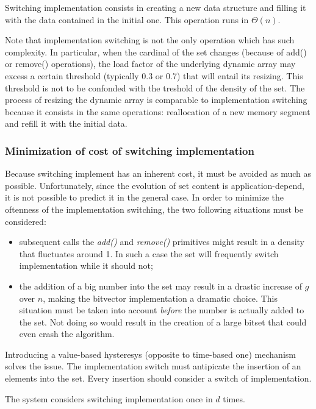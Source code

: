 \documentclass{article}
\newcommand{\complexityvalue}[1]{$\Theta(#1)$}
\newcommand{\prmtv}[1]{\textit{#1()}}
\begin{document}
Switching implementation consists in creating a new data structure and filling it with the data contained in the
initial one.
This operation runs in \complexityvalue{n}.

Note that implementation  switching is not the only operation which has such complexity. In particular, when the
cardinal of the set changes (because of add() or remove() operations), the load factor of the underlying dynamic array may
excess a certain threshold (typically 0.3 or 0.7) that will entail its resizing. This threshold is not to be
confonded with the treshold of the density of the set. The process of resizing the dynamic array
is comparable to implementation switching because it consists in the same operations: reallocation of a new memory segment and
refill it with the initial data.

\subsubsection{Minimization of cost of switching implementation}

Because switching implement has an inherent cost, it must be avoided as much as possible.
Unfortunately, since the evolution of set content is application-depend, it is not possible to predict it in the general case.
In order to minimize the oftenness of the implementation switching, the two following situations must be considered:
\begin{itemize}
  \item subsequent calls the \prmtv{add} and \prmtv{remove} primitives might result in a density that
fluctuates around 1. In such a case  the set will frequently switch implementation while it should not;
\item the addition of a big number into the set may result in a drastic increase of $g$ over $n$, making the
bitvector implementation a dramatic choice. This situation must be taken into account \textit{before}  the number is actually
added to the set. Not doing so would result in the creation of a large bitset that could even crash the algorithm.
\end{itemize}

Introducing a value-based hysteresys (opposite to time-based one) mechanism solves the issue.
The implementation switch must antipicate the insertion of an elements into the set.
Every insertion should consider a switch of implementation.



The system considers switching implementation once in $d$ times.
\end{document}
